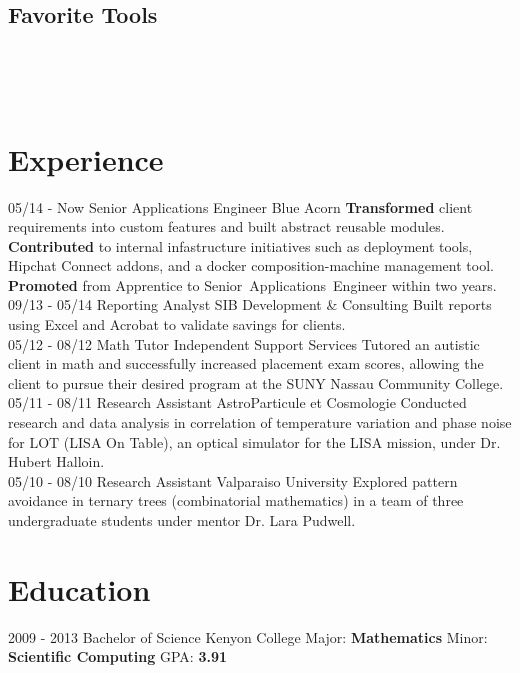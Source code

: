 \documentclass[]{friggeri-cv}
\begin{document}
\begin{aside}
  \section{Favorite Tools}
    ~
\end{aside}
~
\section{Experience}
\begin{entrylist}
  \entry
    {05/14 - Now}
    {Senior Applications Engineer}
    {Blue Acorn}
    {\textbf{{\color{pblue}Transformed}} client requirements into custom features and built abstract reusable modules. \textbf{{\color{pblue}Contributed}} to internal infastructure initiatives such as deployment tools, Hipchat Connect addons, and a docker composition-machine management tool. \textbf{{\color{pblue}Promoted}} from Apprentice to \mbox{Senior Applications Engineer} within two years.}
  \entry
    {09/13 - 05/14}
    {Reporting Analyst}
    {SIB Development \& Consulting}
    {Built reports using Excel and Acrobat to validate savings for clients.\\}
    \entry
    {05/12 - 08/12}
    {Math Tutor}
    {Independent Support Services}
    {Tutored an autistic client in math and successfully increased placement exam scores, allowing the client to pursue their desired program at the SUNY Nassau Community College.\\}
    \entry
    {05/11 - 08/11}
    {Research Assistant}
    {AstroParticule et Cosmologie}
    {Conducted research and data analysis in correlation of temperature variation and phase noise for LOT (LISA On Table), an optical simulator for the LISA mission, under Dr. Hubert Halloin.\\}
    \entry
    {05/10 - 08/10}
    {Research Assistant}
    {Valparaiso University}
    {Explored pattern avoidance in ternary trees (combinatorial mathematics) in a team of three undergraduate students under mentor Dr. Lara Pudwell.\\}
\end{entrylist}
\section{Education}
\begin{entrylist}
  \entry
    {2009 - 2013}
    {Bachelor of Science}
    {Kenyon College}
    {Major: \textbf{Mathematics} Minor: \textbf{Scientific Computing} GPA: \textbf{3.91}}
\end{entrylist}
\end{document}
